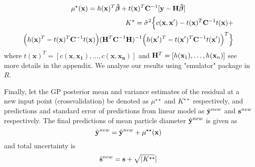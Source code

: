 \documentclass[12pt,titlepage]{report}
\newcommand{\bH}{{\bf H}}
\newcommand{\bC}{{\bf C}}
\newcommand{\bx}{{\bf x}}
\newcommand{\by}{{\bf y}}
\newcommand{\tby}{{\tilde {\bf y}}}
\newcommand{\hby}{{\hat {\bf y}}}
\newcommand{\bs}{{\bf s}}
\theoremstyle{definition}
\theoremstyle{remark}
\begin{document}
\begin{equation}\label{olu1}%
\mu^{\star}(\mathbf{x})=h(\mathbf{x})^T\boldsymbol{\hat\beta}+t(\mathbf{x})^T\bC^{-1}[\by-\bH\boldsymbol{\hat\beta}]
\end{equation}
\begin{multline}\label{olu2}%
\begin{split}
K^{\star}=\hat \sigma^2 \Big \{c(\mathbf{x,x'}) -t(\mathbf{x})^T\bC^{-1} t(\mathbf{x}) + \\ \Big ( h(\mathbf{x})^T-t(\mathbf{x})^T\bC^{-1}t(\mathbf{x}) \Big )
(\bH^T\bC^{-1}\bH)^{-1}\Big ( h(\mathbf{x'})^T-t(\mathbf{x'})^T\bC^{-1}t(\mathbf{x'}) \Big )^T
\Big \}
\end{split}
\end{multline}
where $t(\mathbf{x})^T=[c(\mathbf{x},\mathbf{x_1}),\ldots, c(\mathbf{x},\mathbf{x_n})]$ and $\bH^T=[h(\mathbf{x}_1),\ldots, h(\mathbf{x}_n)]$ see more details in the appendix. We analyse our results using "emulator" package in $R$.

Finally, let the GP posterior mean and variance estimates of the residual at a new input point (crossvalidation) be denoted as $\mu^{\star \star}$ and $K^{\star \star}$ respectively, and predictions and standard error of predictions from linear model as $\tby^{new}$ and $\bs^{new}$ respectively. The final predictions of mean particle diameter $\hby^{new}$ is given as
\begin{equation}\label{r1}
\hby^{new} = \tby^{new} +\mu^{\star \star}(\bx)
\end{equation}
and total uncertainty is
\begin{equation}\label{r1}
\hat \bs^{new} = \bs +\sqrt{|K^{\star \star}}|
\end{equation}
\end{document}

